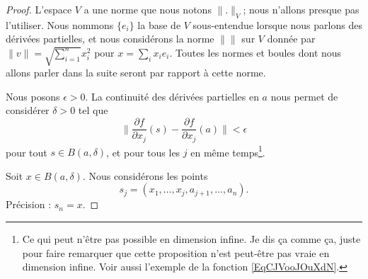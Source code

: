 \begin{proof}
    L'espace \( V\) a une norme que nous notons \( \| . \|_V\); nous n'allons presque pas l'utiliser. Nous nommons \( \{ e_i \}\) la base de \( V\) sous-entendue lorsque nous parlons des dérivées partielles, et nous considérons la norme \( \|  \|\) sur \( V\) donnée par \( \| v \|=\sqrt{ \sum_{i=1}^n }x_i^2\) pour \( x=\sum_ix_ie_i\). Toutes les normes et boules dont nous allons parler dans la suite seront par rapport à cette norme.

    Nous posons \( \epsilon>0\). La continuité des dérivées partielles en \( a\) nous permet de considérer \( \delta>0\) tel que
    \begin{equation}        \label{EQooPBYDooAtPkGl}
        \| \frac{ \partial f }{ \partial x_j }(s)-\frac{ \partial f }{ \partial x_j }(a) \|<\epsilon
    \end{equation}
    pour tout \( s\in  B(a,\delta)\), et pour tous les \( j\) en même temps\footnote{Ce qui peut n'être pas possible en dimension infine. Je dis ça comme ça, juste pour faire remarquer que cette proposition n'est peut-être pas vraie en dimension infine. Voir aussi l'exemple de la fonction \eqref{EqCJVooJOuXdN}.}.

    Soit \( x\in B(a,\delta)\). Nous considérons les points 
    \begin{equation}
        s_j=(x_1,\ldots, x_j,a_{j+1},\ldots, a_n).
    \end{equation}
    Précision : \( s_n=x\).


\end{proof}

